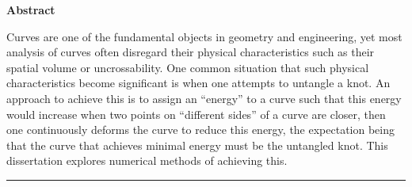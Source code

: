 \documentclass[../dissertation.tex]{subfiles}
\begin{document}
\thispagestyle{plain}
\begin{center}
    \Large
    \textbf{\titlename}
        
        
       
    \vspace{0.9cm}
    \textbf{Abstract}
\end{center}
Curves are one of the fundamental objects in geometry and engineering,
yet most analysis of curves often disregard their physical characteristics such as their spatial volume or uncrossability.
One common situation that such physical characteristics become significant is when one attempts to untangle a knot.
An approach to achieve this is to assign an ``energy'' to a curve such that
this energy would increase when two points on ``different sides'' of a curve are closer,
then one continuously deforms the curve to reduce this energy, 
the expectation being that the curve that achieves minimal energy must be the untangled knot.
This dissertation explores numerical methods of achieving this.

\vspace{0.2cm}
\hrule
\end{document}
